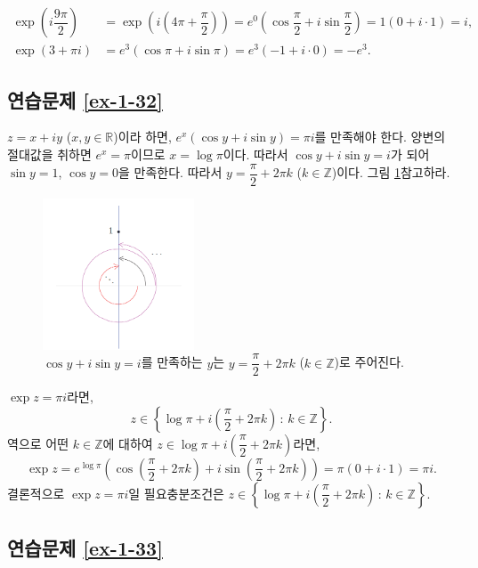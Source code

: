 \begin{align*}
\exp\left(i\dfrac{9\pi}2\right) 
&= \exp\left(i\left(4\pi + \dfrac{\pi}2\right) \right)
= e^0 \left( \cos\dfrac\pi2 + i\sin\dfrac\pi2 \right) 
= 1(0+i\cdot 1) = i, \\
\exp(3+\pi i) &= e^3(\cos \pi + i\sin \pi) = e^3(-1+i\cdot 0) = -e^3.
\end{align*}

\subsection*{연습문제 \ref{ex-1-32}}

$z=x+iy$ ($x,y\in\mathbb R$)이라 하면,
$e^x(\cos y + i\sin y) = \pi i$를 만족해야 한다.
양변의 절대값을 취하면 $e^x = \pi$이므로
$x=\log \pi$이다.
따라서 $\cos y + i\sin y = i$가 되어
$\sin y = 1$, $\cos y=0$을 만족한다.
따라서 $y = \dfrac\pi2 + 2\pi k$ ($k\in \mathbb Z$)이다.
그림 \ref{fig-5-11}\을 참고하라.

\begin{figure}[h!]
\begin{center}
\includegraphics[width=0.4\textwidth]{./Solution/figs/fig-5-11}
\end{center}
\caption{$\cos y + i\sin y = i$를 만족하는 $y$는
$y = \dfrac\pi2 + 2\pi k$ ($k\in \mathbb Z$)로 주어진다.
}
\label{fig-5-11}
\end{figure}

$\exp z = \pi i$라면,
\[
z\in \left\{ \log \pi + i \left(\dfrac\pi 2 + 2\pi k\right) \,:\, k\in\mathbb Z\right\}.
\]
역으로 어떤 $k\in\mathbb Z$에 대하여
$z\in \log \pi + i \left(\dfrac\pi 2 + 2\pi k\right)$라면,
\[
\exp z = e^{\log \pi} \left(
\cos\left(\dfrac\pi2+2\pi k\right) + i \sin\left(\dfrac\pi2+2\pi k\right)
\right) = \pi(0+i\cdot 1) = \pi i.
\]
결론적으로 $\exp z = \pi i$일 필요충분조건은
$z\in \left\{ \log \pi + i \left(\dfrac\pi 2 + 2\pi k\right) \,:\, k\in\mathbb Z\right\}$.

\subsection*{연습문제 \ref{ex-1-33}}

